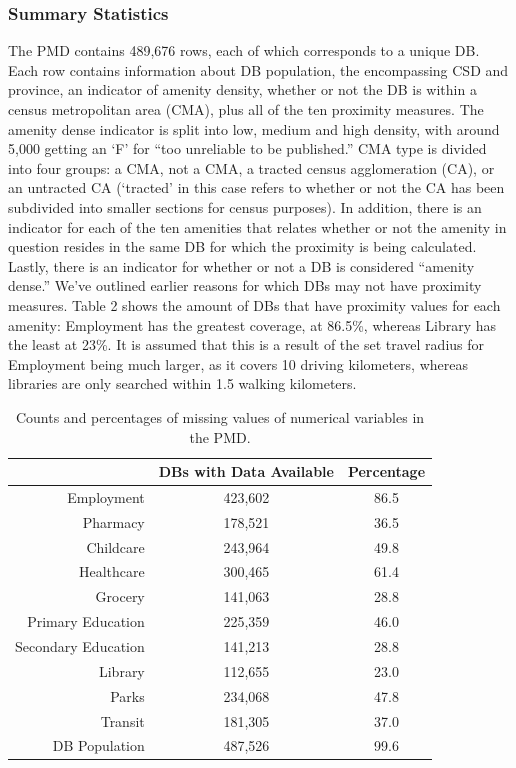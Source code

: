 \documentclass[11pt, a4paper]{article}
\begin{document}
\subsubsection{Summary Statistics}

The PMD contains 489,676 rows, each of which corresponds to a unique DB. Each row contains information about DB population, the encompassing CSD and province, an indicator of amenity density, whether or not the DB is within a census metropolitan area (CMA), plus all of the ten proximity measures. The amenity dense indicator is split into low, medium and high density, with around 5,000 getting an `F' for ``too unreliable to be published.'' CMA type is divided into four groups: a CMA, not a CMA, a tracted census agglomeration (CA), or an untracted CA (`tracted' in this case refers to whether or not the CA has been subdivided into smaller sections for census purposes). In addition, there is an indicator for each of the ten amenities that relates whether or not the amenity in question resides in the same DB for which the proximity is being calculated. Lastly, there is an indicator for whether or not a DB is considered ``amenity dense.'' We've outlined earlier reasons for which DBs may not have proximity measures. Table 2 shows the amount of DBs that have proximity values for each amenity: Employment has the greatest coverage, at 86.5\%, whereas Library has the least at 23\%. It is assumed that this is a result of the set travel radius for Employment being much larger, as it covers 10 driving kilometers, whereas libraries are only searched within 1.5 walking kilometers.





\begin{table}[H]
\centering
\caption[Missing data]{Counts and percentages of missing values of numerical variables in the PMD.}\label{missingdata}
\begin{tabular}{|r|cc|}
  \hline
 & DBs with Data Available & Percentage \\
  \hline
Employment & 423,602 & 86.5 \\
  Pharmacy & 178,521 & 36.5 \\
  Childcare & 243,964 & 49.8 \\
  Healthcare & 300,465 & 61.4 \\
  Grocery & 141,063 & 28.8 \\
  Primary Education & 225,359 & 46.0 \\
  Secondary Education & 141,213 & 28.8 \\
  Library & 112,655 & 23.0 \\
  Parks & 234,068 & 47.8 \\
  Transit & 181,305 & 37.0 \\
  DB Population & 487,526 & 99.6 \\
   \hline
\end{tabular}
\end{table}
\end{document}
